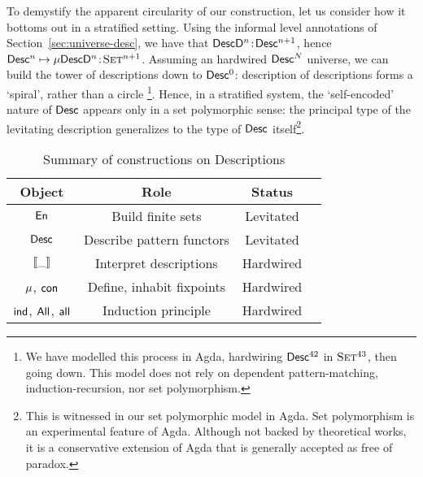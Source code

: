 
To demystify the apparent circularity of our construction, let us
consider how it bottoms out in a stratified setting. Using the
informal level annotations of Section~\ref{sec:universe-desc}, we have
that \(\Bhab{\DescD^n}{\Desc^{n+1}}\), hence \(\Bhab{\Desc^n \mapsto
  \Mu{\DescD^n}}{\Set^{n+1}}\). Assuming an hardwired $\Desc^N$
universe, we can build the tower of descriptions down to $\Desc^0$:
description of descriptions forms a `spiral', rather than a
circle \footnote{We have modelled this process in Agda, hardwiring
  $\Desc^{42}$ in $\Set^{43}$, then going down. This model does not
  rely on dependent pattern-matching, induction-recursion, nor set
  polymorphism.}. Hence, in a stratified system, the `self-encoded'
nature of $\Desc$ appears only in a set polymorphic sense: the
principal type of the levitating description generalizes to the type
of $\Desc$ itself\footnote{This is witnessed in our set polymorphic
  model in Agda. Set polymorphism is an experimental feature of
  Agda. Although not backed by theoretical works, it is a conservative
  extension of Agda that is generally accepted as free of paradox.}.

\begin{table}

{
\begin{center}
\begin{tabular}{|c|c|c|c|}
\hline
Object                & Role                        & Status \\
\hline
\hline
$\EnumU$              & Build finite sets           & Levitated \\
\hline
$\Desc$               & Describe pattern functors   & Levitated \\
\hline
$\SYMBdescop{\_}$     & Interpret descriptions      & Hardwired \\
\hline
$\SYMBMu$, $\SYMBCon$ & Define, inhabit fixpoints   & Hardwired \\
\hline
$\SYMBind$, $\SYMBAll$, $\SYMBall$  
                      & Induction principle         & Hardwired \\
\hline
\end{tabular}
\end{center}
}

\caption{Summary of constructions on Descriptions}
\label{tab:sumup-operators}

\end{table}
